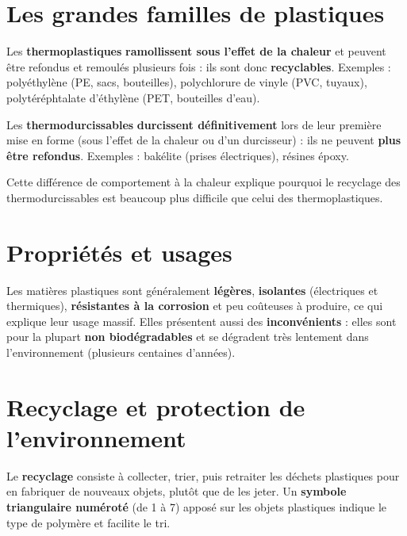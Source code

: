 \section{Les grandes familles de plastiques}

\begin{propriete}[Thermoplastiques]
Les \textbf{thermoplastiques} \textbf{ramollissent sous l'effet de la chaleur} et
peuvent être refondus et remoulés plusieurs fois : ils sont donc \textbf{recyclables}.
Exemples : polyéthylène (PE, sacs, bouteilles), polychlorure de vinyle (PVC, tuyaux),
polytéréphtalate d'éthylène (PET, bouteilles d'eau).
\end{propriete}

\begin{propriete}[Thermodurcissables]
Les \textbf{thermodurcissables} \textbf{durcissent définitivement} lors de leur première
mise en forme (sous l'effet de la chaleur ou d'un durcisseur) : ils ne peuvent
\textbf{plus être refondus}. Exemples : bakélite (prises électriques), résines époxy.
\end{propriete}

\begin{remarque}
Cette différence de comportement à la chaleur explique pourquoi le recyclage des
thermodurcissables est beaucoup plus difficile que celui des thermoplastiques.
\end{remarque}

\section{Propriétés et usages}

\begin{propriete}
Les matières plastiques sont généralement \textbf{légères}, \textbf{isolantes}
(électriques et thermiques), \textbf{résistantes à la corrosion} et peu coûteuses à
produire, ce qui explique leur usage massif. Elles présentent aussi des
\textbf{inconvénients} : elles sont pour la plupart \textbf{non biodégradables} et se
dégradent très lentement dans l'environnement (plusieurs centaines d'années).
\end{propriete}

\section{Recyclage et protection de l'environnement}

\begin{definition}[Recyclage]
Le \textbf{recyclage} consiste à collecter, trier, puis retraiter les déchets plastiques
pour en fabriquer de nouveaux objets, plutôt que de les jeter. Un \textbf{symbole
triangulaire numéroté} (de 1 à 7) apposé sur les objets plastiques indique le type de
polymère et facilite le tri.
\end{definition}

